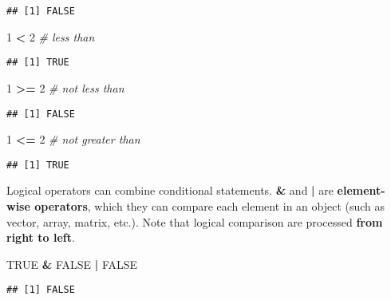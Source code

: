 \documentclass[
  12pt,
]{article}
\newenvironment{Shaded}{\begin{snugshade}}{\end{snugshade}}
\newcommand{\CommentTok}[1]{\textcolor[rgb]{0.56,0.35,0.01}{\textit{#1}}}
\newcommand{\ConstantTok}[1]{\textcolor[rgb]{0.56,0.35,0.01}{#1}}
\newcommand{\DecValTok}[1]{\textcolor[rgb]{0.00,0.00,0.81}{#1}}
\newcommand{\SpecialCharTok}[1]{\textcolor[rgb]{0.81,0.36,0.00}{\textbf{#1}}}
\begin{document}
\begin{verbatim}
## [1] FALSE
\end{verbatim}

\begin{Shaded}
\begin{Highlighting}[]
\DecValTok{1} \SpecialCharTok{\textless{}}  \DecValTok{2}   \CommentTok{\# less than}
\end{Highlighting}
\end{Shaded}

\begin{verbatim}
## [1] TRUE
\end{verbatim}

\begin{Shaded}
\begin{Highlighting}[]
\DecValTok{1} \SpecialCharTok{\textgreater{}=} \DecValTok{2}   \CommentTok{\# not less than}
\end{Highlighting}
\end{Shaded}

\begin{verbatim}
## [1] FALSE
\end{verbatim}

\begin{Shaded}
\begin{Highlighting}[]
\DecValTok{1} \SpecialCharTok{\textless{}=} \DecValTok{2}   \CommentTok{\# not greater than}
\end{Highlighting}
\end{Shaded}

\begin{verbatim}
## [1] TRUE
\end{verbatim}

Logical operators can combine conditional statements. \textbf{\&} and
\textbf{|} are \textbf{element-wise operators}, which they can compare
each element in an object (such as vector, array, matrix, etc.). Note
that logical comparison are processed \textbf{from right to left}.

\begin{Shaded}
\begin{Highlighting}[]
\ConstantTok{TRUE} \SpecialCharTok{\&}  \ConstantTok{FALSE} \SpecialCharTok{|} \ConstantTok{FALSE}
\end{Highlighting}
\end{Shaded}

\begin{verbatim}
## [1] FALSE
\end{verbatim}
\end{document}
